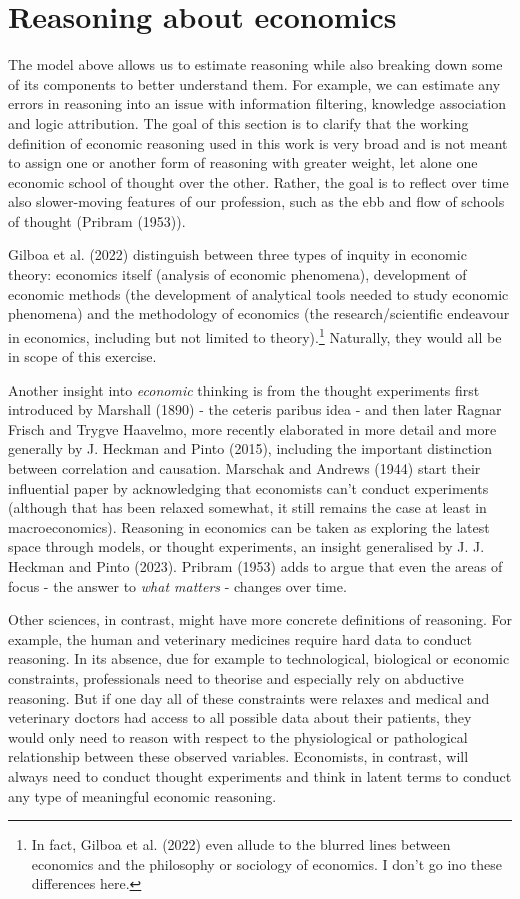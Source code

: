 \documentclass[
]{article}
\begin{document}
\section{Reasoning about economics}\label{reasoning-about-economics}

The model above allows us to estimate reasoning while also breaking down
some of its components to better understand them. For example, we can
estimate any errors in reasoning into an issue with information
filtering, knowledge association and logic attribution. The goal of this
section is to clarify that the working definition of economic reasoning
used in this work is very broad and is not meant to assign one or
another form of reasoning with greater weight, let alone one economic
school of thought over the other. Rather, the goal is to reflect over
time also slower-moving features of our profession, such as the ebb and
flow of schools of thought (Pribram (1953)).

Gilboa et al. (2022) distinguish between three types of inquity in
economic theory: economics itself (analysis of economic phenomena),
development of economic methods (the development of analytical tools
needed to study economic phenomena) and the methodology of economics
(the research/scientific endeavour in economics, including but not
limited to theory).\footnote{In fact, Gilboa et al. (2022) even allude
  to the blurred lines between economics and the philosophy or sociology
  of economics. I don't go ino these differences here.} Naturally, they
would all be in scope of this exercise.

Another insight into \emph{economic} thinking is from the thought
experiments first introduced by Marshall (1890) - the ceteris paribus
idea - and then later Ragnar Frisch and Trygve Haavelmo, more recently
elaborated in more detail and more generally by J. Heckman and Pinto
(2015), including the important distinction between correlation and
causation. Marschak and Andrews (1944) start their influential paper by
acknowledging that economists can't conduct experiments (although that
has been relaxed somewhat, it still remains the case at least in
macroeconomics). Reasoning in economics can be taken as exploring the
latest space through models, or thought experiments, an insight
generalised by J. J. Heckman and Pinto (2023). Pribram (1953) adds to
argue that even the areas of focus - the answer to \emph{what matters} -
changes over time.

Other sciences, in contrast, might have more concrete definitions of
reasoning. For example, the human and veterinary medicines require hard
data to conduct reasoning. In its absence, due for example to
technological, biological or economic constraints, professionals need to
theorise and especially rely on abductive reasoning. But if one day all
of these constraints were relaxes and medical and veterinary doctors had
access to all possible data about their patients, they would only need
to reason with respect to the physiological or pathological relationship
between these observed variables. Economists, in contrast, will always
need to conduct thought experiments and think in latent terms to conduct
any type of meaningful economic reasoning.
\end{document}
